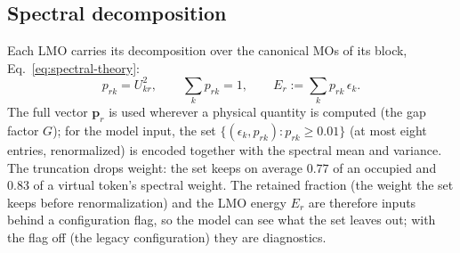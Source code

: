 \documentclass[11pt,a4paper]{article}
\newcommand{\vb}[1]{\bm{#1}}
\newcommand{\set}[1]{\{#1\}}
\begin{document}
\subsection{Spectral decomposition}
Each LMO carries its decomposition over the canonical MOs of its block, Eq.~\eqref{eq:spectral-theory}:
\begin{equation}
p_{rk}=U_{kr}^2,\qquad \sum_k p_{rk}=1,\qquad E_r:=\sum_k p_{rk}\,\epsilon_k .
\label{eq:spectral}
\end{equation}
The full vector $\vb{p}_r$ is used wherever a physical quantity is computed (the gap factor $G$); for the model input, the set $\set{(\epsilon_k,p_{rk}):p_{rk}\ge0.01}$ (at most eight entries, renormalized) is encoded together with the spectral mean and variance. The truncation drops weight: the set keeps on average $0.77$ of an occupied and $0.83$ of a virtual token's spectral weight. The retained fraction (the weight the set keeps before renormalization) and the LMO energy $E_r$ are therefore inputs behind a configuration flag, so the model can see what the set leaves out; with the flag off (the legacy configuration) they are diagnostics.
\end{document}
